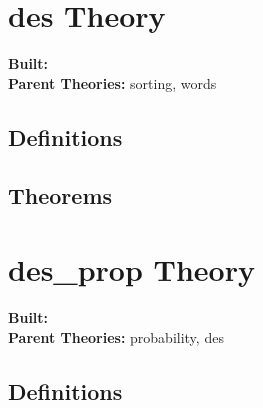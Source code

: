 \documentclass[11pt, twoside]{article}
\begin{document}



\tableofcontents
\cleardoublepage
\HOLpagestyle

\section{des Theory}
\begin{flushleft}
\textbf{Built:} \HOLdesDate \\[2pt]
\textbf{Parent Theories:} sorting, words
\end{flushleft}


\subsection{Definitions}

\HOLdesDefinitions

\subsection{Theorems}

\HOLdesTheorems

\section{des_prop Theory}
\begin{flushleft}
\textbf{Built:} \HOLdesXXpropDate \\[2pt]
\textbf{Parent Theories:} probability, des
\end{flushleft}


\subsection{Definitions}
\end{document}
